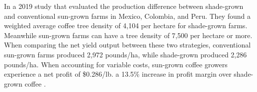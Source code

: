 \documentclass[../main.tex]{subfiles}
\begin{document}
In a 2019 study that evaluated the production difference between shade-grown and conventional sun-grown farms in Mexico, Colombia, and Peru. They found a weighted average coffee tree density of 4,104 per hectare for shade-grown farms. Meanwhile sun-grown farms can have a tree density of 7,500 per hectare or more. When comparing the net yield output between these two strategies, conventional sun-grown farms produced 2,972 pounds/ha, while shade-grown produced 2,286 pounds/ha. When accounting for variable costs, sun-grown coffee growers experience a net profit of \$0.286/lb. a 13.5\% increase in profit margin over shade-grown coffee \parencite{hernandez-aguilera_economics_2019}. 
\end{document}
